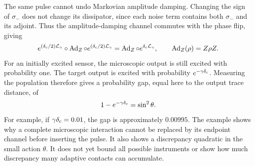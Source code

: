 \documentclass[11pt,a4paper]{article}
\numberwithin{equation}{section}
\theoremstyle{remark}
\begin{document}
The same pulse cannot undo Markovian amplitude damping. Changing the sign
of $\sigma_-$ does not change its dissipator, since each noise term contains
both $\sigma_-$ and its adjoint. Thus the amplitude-damping channel commutes
with the phase flip, giving
\begin{equation}
 e^{(\delta_{\rm c}/2)\mathcal L_\gamma}\circ\operatorname{Ad}_Z
 \circ e^{(\delta_{\rm c}/2)\mathcal L_\gamma}
 =\operatorname{Ad}_Z\circ e^{\delta_{\rm c}\mathcal L_\gamma},
 \qquad \operatorname{Ad}_Z(\rho)=Z\rho Z.
 \label{sim:markov-echo}
\end{equation}
For an initially excited sensor, the microscopic output is still excited
with probability one. The target output is excited with probability
$e^{-\gamma \delta_{\rm c}}$. Measuring the population therefore gives a probability
gap, equal here to the output trace distance, of
\begin{equation}
 1-e^{-\gamma \delta_{\rm c}}=\sin^2\theta.
 \label{sim:echo-gap}
\end{equation}
For example, if $\gamma \delta_{\rm c}=0.01$, the gap is approximately $0.00995$.
The example shows why a complete microscopic interaction cannot be replaced
by its endpoint channel before inserting the pulse. It also shows a
discrepancy quadratic in the small action $\theta$. It does not yet bound
all possible instruments or show how much discrepancy many adaptive
contacts can accumulate.
\end{document}
